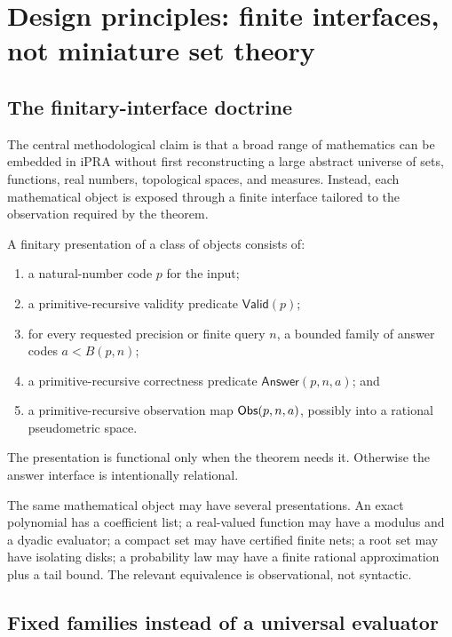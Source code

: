 \section{Design principles: finite interfaces, not miniature set theory}
\label{sec:principles}

\subsection{The finitary-interface doctrine}

The central methodological claim is that a broad range of mathematics can be
embedded in iPRA without first reconstructing a large abstract universe of
sets, functions, real numbers, topological spaces, and measures.  Instead, each
mathematical object is exposed through a finite interface tailored to the
observation required by the theorem.

\begin{definition}
A finitary presentation of a class of objects consists of:
\begin{enumerate}[label=(\roman*)]
\item a natural-number code \(p\) for the input;
\item a primitive-recursive validity predicate \(\mathsf{Valid}(p)\);
\item for every requested precision or finite query \(n\), a bounded family of
      answer codes \(a<B(p,n)\);
\item a primitive-recursive correctness predicate
      \(\mathsf{Answer}(p,n,a)\); and
\item a primitive-recursive observation map \(\mathsf{Obs}(p,n,a)\), possibly into a
      rational pseudometric space.
\end{enumerate}
The presentation is functional only when the theorem needs it.  Otherwise the
answer interface is intentionally relational.
\end{definition}

The same mathematical object may have several presentations.  An exact
polynomial has a coefficient list; a real-valued function may have a modulus
and a dyadic evaluator; a compact set may have certified finite nets; a root
set may have isolating disks; a probability law may have a finite rational
approximation plus a tail bound.  The relevant equivalence is observational,
not syntactic.

\subsection{Fixed families instead of a universal evaluator}

